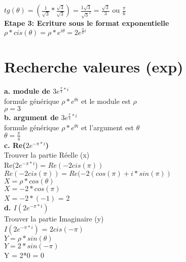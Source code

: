 $tg(\theta) = (\frac{1}{\sqrt{3}} * \frac{\sqrt{3}}{\sqrt{3}}) = \frac{1\sqrt{3}}{\sqrt{3}^{2}} = \frac{\sqrt{3}}{3}$ ou $\frac{\pi}{6}$ \\

\vspace{3mm}
\textbf{Etape 3: Ecriture sous le format exponentielle} \\

$\rho*cis(\theta) = \rho * e^{i\theta} = 2e^{\frac{\pi}{6}i}$ \\

\newpage
\section{Recherche valeures (exp)}

\textbf{a. module de $3e^{\frac{\pi}{4}*i}$} \\

formule générique $\rho * e^{\theta i}$ et le module est $\rho$ \\

$\rho = 3 $ \\

\vspace{3mm}
\textbf{b. argument de $3e^{\frac{\pi}{4}*i}$} \\

formule générique $\rho * e^{\theta i}$ et l'argument est $\theta$ \\

$\theta = \frac{\pi}{4} $ \\

\vspace{3mm}
\textbf{c. Re($2e^{-\pi*i}$)} \\

Trouver la partie Réelle (x) \\

Re($2e^{-\pi*i}$) = $ Re(-2cis(\pi))$ \\

$Re(-2cis(\pi)) = Re( - 2 (cos(\pi)+ i*sin(\pi) ) $ \\

$ X = \rho*cos(\theta) $ \\

$ X = -2*cos(\pi) $ \\

$ X = -2*(-1) $ = 2 \\


\vspace{5mm}
\textbf{d. $I(2e^{-\pi*i})$} \\

Trouver la partie Imaginaire (y) \\

$I(2e^{-\pi*i})$ = $2cis(-\pi)$ \\

$ Y = \rho*sin(\theta) $ \\

$ Y = 2*sin(-\pi) $ \\

Y = 2*0 = 0  \\
